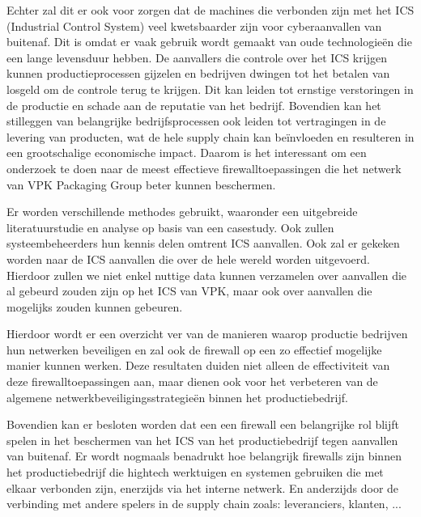 Echter zal dit er ook voor zorgen dat de machines die verbonden zijn met het ICS (Industrial Control System) veel kwetsbaarder zijn voor cyberaanvallen van buitenaf. Dit is omdat er vaak gebruik wordt gemaakt van oude technologieën die een lange levensduur hebben. De aanvallers die controle over het ICS krijgen kunnen productieprocessen gijzelen en bedrijven dwingen tot het betalen van losgeld om de controle terug te krijgen. Dit kan leiden tot ernstige verstoringen in de productie en schade aan de reputatie van het bedrijf. Bovendien kan het stilleggen van belangrijke bedrijfsprocessen ook leiden tot vertragingen in de levering van producten, wat de hele supply chain kan beïnvloeden en resulteren in een grootschalige economische impact. Daarom is het interessant om een onderzoek te doen naar de meest effectieve firewalltoepassingen die het netwerk van VPK Packaging Group beter kunnen beschermen. 

Er worden verschillende methodes gebruikt, waaronder een uitgebreide literatuurstudie en analyse op basis van een casestudy. Ook zullen systeembeheerders hun kennis delen omtrent ICS aanvallen. Ook zal er gekeken worden naar de ICS aanvallen die over de hele wereld worden uitgevoerd. Hierdoor zullen we niet enkel nuttige data kunnen verzamelen over aanvallen die al gebeurd zouden zijn op het ICS van VPK, maar ook over aanvallen die mogelijks zouden kunnen gebeuren.

Hierdoor wordt er een overzicht ver van de manieren waarop productie bedrijven hun netwerken beveiligen en zal ook de firewall op een zo effectief mogelijke manier kunnen werken. Deze resultaten duiden niet alleen de effectiviteit van deze firewalltoepassingen aan, maar dienen ook voor het verbeteren van de algemene netwerkbeveiligingsstrategieën binnen het productiebedrijf.

Bovendien kan er besloten worden dat een een firewall een belangrijke rol blijft spelen in het beschermen van het ICS van het productiebedrijf tegen aanvallen van buitenaf. Er wordt nogmaals benadrukt hoe belangrijk firewalls zijn binnen het productiebedrijf die hightech werktuigen en systemen gebruiken die met elkaar verbonden zijn, enerzijds via het interne netwerk. En anderzijds door de verbinding met andere spelers in de supply chain zoals: leveranciers, klanten, ...
